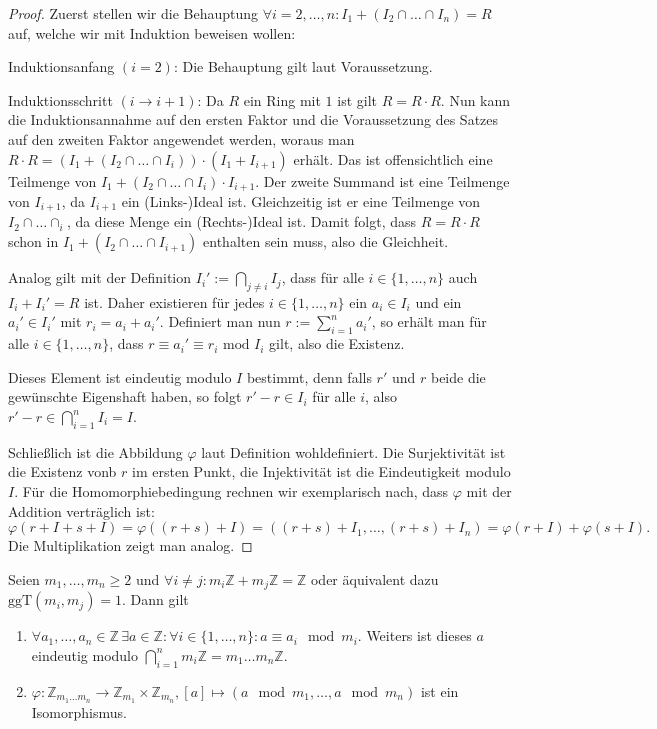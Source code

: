 \begin{proof}
    Zuerst stellen wir die Behauptung $\forall i=2,\ldots,n: I_1+(I_2\cap \ldots \cap I_n)=R$ auf, welche wir mit Induktion
    beweisen wollen:

    Induktionsanfang $(i=2)$: Die Behauptung gilt laut Voraussetzung.

    Induktionsschritt $(i\to i+1)$: Da $R$ ein Ring mit $1$ ist gilt
    $R=R\cdot R$. Nun kann die Induktionsannahme auf den ersten Faktor und die Voraussetzung des Satzes auf den zweiten Faktor angewendet werden,
    woraus man $R\cdot R=(I_1+(I_2\cap\ldots\cap I_i))\cdot(I_1+I_{i+1})$ erhält. Das ist offensichtlich eine Teilmenge
    von $I_1+(I_2\cap\ldots\cap I_i)\cdot I_{i+1}$. Der zweite Summand ist eine Teilmenge von $I_{i+1}$, da
    $I_{i+1}$ ein (Links-)Ideal ist. Gleichzeitig ist er eine Teilmenge von $I_2\cap\ldots \cap _i$, da diese Menge ein (Rechts-)Ideal ist.
    Damit folgt, dass $R=R\cdot R$ schon in $I_1+(I_2\cap\ldots \cap I_{i+1})$ enthalten sein muss, also die Gleichheit.

    Analog gilt mit der Definition $I_i':=\bigcap_{j\neq i}I_j$, dass für alle $i\in\{1,\ldots,n\}$
    auch $I_i+I_i'=R$ ist. Daher existieren für jedes $i\in\{1,\ldots,n\}$ ein $a_i\in I_i$ und ein $a_i'\in I_i'$
    mit $r_i=a_i+a_i'$. Definiert man nun $r:=\sum_{i=1}^na_i'$, so erhält man für alle $i\in\{1,\ldots,n\}$, dass
    $r\equiv a_i'\equiv r_i \text{ mod }I_i$ gilt, also die Existenz.

    Dieses Element ist eindeutig modulo $I$ bestimmt, denn falls $r'$ und $r$ beide die gewünschte Eigenshaft haben,
    so folgt $r'-r\in I_i$ für alle $i$, also $r'-r\in\bigcap_{i=1}^nI_i=I$.

    Schließlich ist die Abbildung $\varphi$ laut Definition wohldefiniert. Die Surjektivität ist die Existenz vonb $r$ im ersten Punkt,
    die Injektivität ist die Eindeutigkeit modulo $I$. Für die Homomorphiebedingung rechnen wir exemplarisch nach, dass
    $\varphi$ mit der Addition verträglich ist:
    $$\varphi(r+I+s+I)=\varphi((r+s)+I)=((r+s)+I_1,\ldots,(r+s)+I_n)=\varphi(r+I)+\varphi(s+I).$$
    Die Multiplikation zeigt man analog.
\end{proof}

\begin{corollary}
    Seien $m_1,\ldots,m_n\geq 2$ und $\forall i\neq j: m_i\mathbb{Z}+m_j\mathbb{Z}=\mathbb{Z}$
    oder äquivalent dazu $\text{ggT}(m_i,m_j)=1$. Dann gilt
    \begin{enumerate}
        \item $\forall a_1,\ldots,a_n\in\mathbb{Z}\,\exists a\in\mathbb{Z}:\forall i\in\{1,\ldots,n\}: a\equiv a_i \mod m_i$.
        Weiters ist dieses $a$ eindeutig modulo $\bigcap_{i=1}^{n}m_i\mathbb{Z}=m_1\ldots m_n\mathbb{Z}$.
        \item $\varphi:\mathbb{Z}_{m_1\ldots m_n}\to \mathbb{Z}_{m_1}\times \mathbb{Z}_{m_n}, [a]\mapsto (a\mod m_1,\ldots, a\mod m_n)$
        ist ein Isomorphismus.
    \end{enumerate}
\end{corollary}


